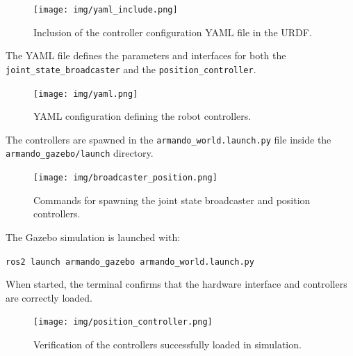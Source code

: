 \documentclass{article}
\begin{document}
\begin{enumerate}
\begin{figure}[H]
    \centering
    \texttt{[image: img/yaml\_include.png]}
    \caption{Inclusion of the controller configuration YAML file in the URDF.}
    \label{fig:yaml_include}
\end{figure}

\noindent The YAML file defines the parameters and interfaces for both the \lstinline{joint_state_broadcaster} and the \lstinline{position_controller}.

\begin{figure}[H]
    \centering
    \texttt{[image: img/yaml.png]}
    \caption{YAML configuration defining the robot controllers.}
    \label{fig:yaml}
\end{figure}

\noindent The controllers are spawned in the \lstinline{armando_world.launch.py} file inside the \lstinline{armando_gazebo/launch} directory.

\begin{figure}[H]
    \centering
    \texttt{[image: img/broadcaster\_position.png]}
    \caption{Commands for spawning the joint state broadcaster and position controllers.}
    \label{fig:broadcaster_position}
\end{figure}

\noindent The Gazebo simulation is launched with:
\begin{center}
\small
\texttt{ros2 launch armando\_gazebo armando\_world.launch.py}
\end{center}

\noindent When started, the terminal confirms that the hardware interface and controllers are correctly loaded.

\begin{figure}[H]
    \centering
    \texttt{[image: img/position\_controller.png]}
    \caption{Verification of the controllers successfully loaded in simulation.}
    \label{fig:position_controller}
\end{figure}
\end{enumerate}
\pagebreak
\end{document}
